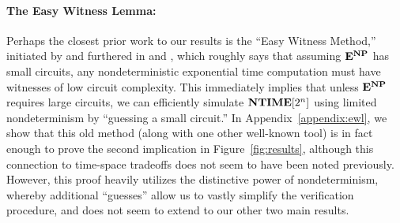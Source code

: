 \documentclass[11pt]{article}
\newcommand{\todo}[1]{\textcolor{red}{TODO: #1}}
\def\cl{\bf}
\begin{document}

\paragraph{The Easy Witness Lemma:} Perhaps the closest prior work to our results is the ``Easy Witness Method,'' initiated by \cite{Kabenets} and furthered in \cite{IKW} and \cite{williams-sat}, which roughly says that assuming ${\cl E}^{\cl NP}$ has small circuits, any nondeterministic exponential time computation must have witnesses of low circuit complexity. This immediately implies that unless ${\cl E}^{\cl NP}$ requires large circuits, we can efficiently simulate ${\cl NTIME}[2^n]$ using limited nondeterminism by ``guessing a small circuit.'' In Appendix~\ref{appendix:ewl}, we show that this old method (along with one other well-known tool) is in fact enough to prove the second implication in Figure~\ref{fig:results}, although this connection to time-space tradeoffs does not seem to have been noted previously. However, this proof heavily utilizes the distinctive power of nondeterminism, whereby additional ``guesses'' allow us to vastly simplify the verification procedure, and does not seem to extend to our other two main results.
\end{document}

